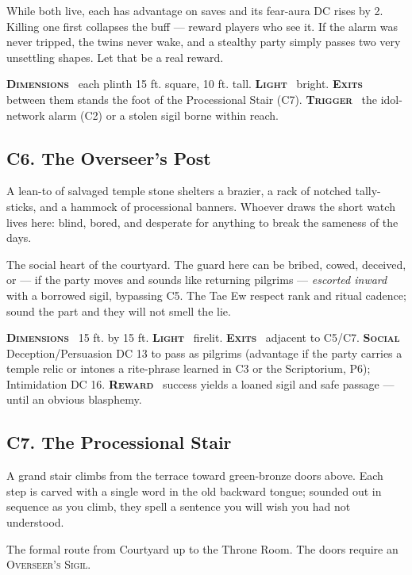 \documentclass[10pt,twoside]{article}
\newcommand{\tech}[1]{\textbf{\scshape\textcolor{stone}{#1}}\ }
\newcommand{\eqname}[1]{\textsc{#1}}
\begin{document}
\begin{dmnote}
While both live, each has advantage on saves and its fear-aura DC rises by 2. Killing
one first collapses the buff --- reward players who see it. If the alarm was never
tripped, the twins never wake, and a stealthy party simply passes two very unsettling
shapes. Let that be a real reward.
\end{dmnote}

\begin{techbox}
\tech{Dimensions} each plinth 15 ft. square, 10 ft. tall. \tech{Light} bright.
\tech{Exits} between them stands the foot of the Processional Stair (C7).
\tech{Trigger} the idol-network alarm (C2) or a stolen sigil borne within reach.
\end{techbox}

\subsection{C6. The Overseer's Post}
\begin{readaloud}
A lean-to of salvaged temple stone shelters a brazier, a rack of notched
tally-sticks, and a hammock of processional banners. Whoever draws the short watch
lives here: blind, bored, and desperate for anything to break the sameness of the
days.
\end{readaloud}
The social heart of the courtyard. The guard here can be bribed, cowed, deceived, or
--- if the party moves and sounds like returning pilgrims --- \emph{escorted inward}
with a borrowed sigil, bypassing C5. The Tae Ew respect rank and ritual cadence; sound
the part and they will not smell the lie.

\begin{techbox}
\tech{Dimensions} 15 ft. by 15 ft. \tech{Light} firelit. \tech{Exits} adjacent to
C5/C7. \tech{Social} Deception/Persuasion DC 13 to pass as pilgrims (advantage if the
party carries a temple relic or intones a rite-phrase learned in C3 or the
Scriptorium, P6); Intimidation DC 16. \tech{Reward} success yields a loaned sigil and
safe passage --- until an obvious blasphemy.
\end{techbox}

\subsection{C7. The Processional Stair}
\begin{readaloud}
A grand stair climbs from the terrace toward green-bronze doors above. Each step is
carved with a single word in the old backward tongue; sounded out in sequence as you
climb, they spell a sentence you will wish you had not understood.
\end{readaloud}
The formal route from Courtyard up to the Throne Room. The doors require an
\eqname{Overseer's Sigil}.
\end{document}
